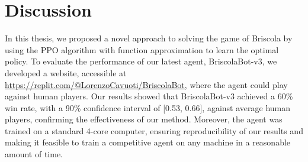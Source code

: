 \chapter{Discussion}
In this thesis, we proposed a novel approach to solving the game of Briscola by using the PPO algorithm with function approximation to learn the optimal policy. To evaluate the performance of our latest agent, BriscolaBot-v3, we developed a website, accessible at \url{https://replit.com/@LorenzoCavuoti/BriscolaBot}, where the agent could play against human players. Our results showed that BriscolaBot-v3 achieved a 60\% win rate, with a 90\% confidence interval of [0.53, 0.66], against average human players, confirming the effectiveness of our method. Moreover, the agent was trained on a standard 4-core computer, ensuring reproducibility of our results and making it feasible to train a competitive agent on any machine in a reasonable amount of time.

